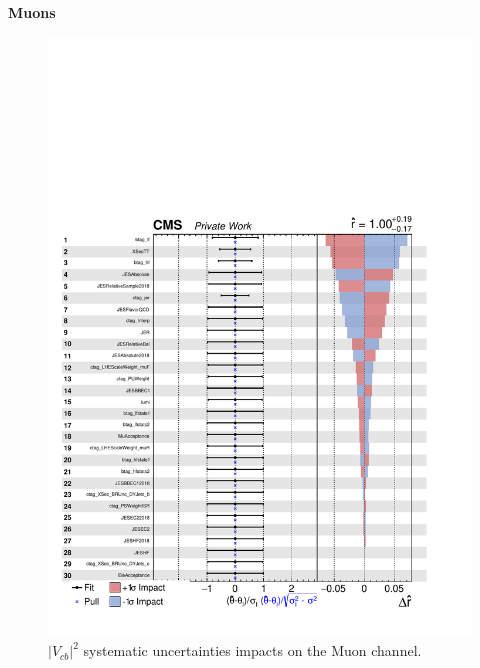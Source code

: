 \begin{center}
     {\Huge \textbf{Muons}}
\end{center}
\begin{figure}[H]
    \centering
    \includegraphics[width=\linewidth]{fig/chap09-sigback/muons_impact.pdf}
    \caption{$|V_{cb}|^2$ systematic uncertainties impacts on the Muon channel.}
    \label{fig:MuImpact}
\end{figure}


